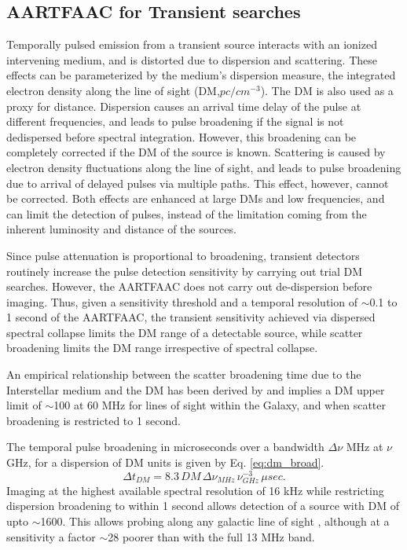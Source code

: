 \documentclass{aa}
\begin{document}
\subsection{\label{sub:AARTFAAC-for-Transient}AARTFAAC for Transient searches}

Temporally pulsed  emission from  a transient source  interacts with  an ionized
intervening medium,  and is  distorted due to  dispersion and  scattering. These
effects can be parameterized by  the medium's dispersion measure, the integrated
electron density along the line of  sight (DM,$pc/cm^{-3}$). The DM is also used
as a proxy for distance. Dispersion causes an arrival time delay of the pulse at
different  frequencies, and  leads  to pulse  broadening  if the  signal is  not
dedispersed  before  spectral  integration.  However,  this  broadening  can  be
completely corrected if  the DM of the source is known.  Scattering is caused by
electron  density  fluctuations along  the  line of  sight,  and leads to  pulse
broadening due  to arrival  of delayed pulses  via multiple paths.  This effect,
however, cannot  be corrected. Both  effects are enhanced  at large DMs  and low
frequencies, and  can limit the detection  of pulses, instead  of the limitation
coming from the inherent luminosity and distance of the sources.

Since  pulse  attenuation is  proportional  to  broadening, transient  detectors
routinely  increase the  pulse detection  sensitivity by  carrying out  trial DM
searches.   However,  the  AARTFAAC  does  not carry  out  de-dispersion  before
imaging.   Thus, given  a sensitivity  threshold  and a  temporal resolution  of
$\sim$0.1 to  1 second of the  AARTFAAC, the transient  sensitivity achieved via
dispersed spectral  collapse limits the DM  range of a  detectable source, while
scatter broadening limits the DM range irrespective of spectral collapse.

An  empirical  relationship between  the  scatter  broadening  time due  to  the
Interstellar     medium     and    the     DM     has     been    derived     by
\citet{bhat2004multifrequency} and implies  a DM upper limit of  $\sim$100 at 60
MHz  for lines  of  sight within  the  Galaxy, and  when  scatter broadening  is
restricted to 1 second.

The temporal pulse  broadening in microseconds over a  bandwidth $\Delta\nu$ MHz
at $\nu$ GHz, for a dispersion of DM units is given by Eq. \ref{eq:dm_broad}.
\begin{equation}
\Delta t_{DM}=8.3\,DM\,\Delta\nu_{MHz}\,\nu_{GHz}^{-3}\, \mu sec.\label{eq:dm_broad}
\end{equation}
Imaging at the highest available spectral resolution of 16 kHz while restricting
dispersion broadening to within 1 second allows detection of a source with DM of
upto  $\sim$1600.  This  allows  probing   along  any  galactic  line  of  sight
\citep{cordes2002ne2001},  although at  a sensitivity  a factor  $\sim$28 poorer
than  with the  full  13  MHz band. 
\end{document}

